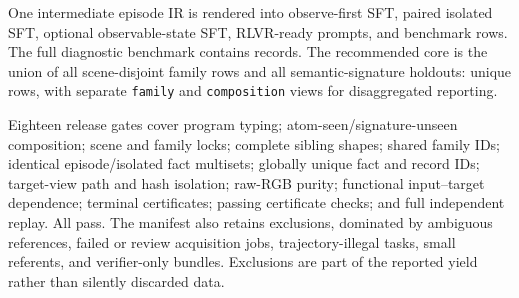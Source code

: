 One intermediate episode IR is rendered into observe-first SFT, paired
isolated SFT, optional observable-state SFT, RLVR-ready prompts, and benchmark
rows.  The full diagnostic benchmark contains \EpiBenchmarkRecords{} records.
The recommended core is the union of all scene-disjoint family rows and all
semantic-signature holdouts: \EpiCoreBenchmarkRecords{} unique rows, with
separate \texttt{family} and \texttt{composition} views for disaggregated
reporting.

Eighteen release gates cover program typing; atom-seen/signature-unseen
composition; scene and family locks; complete sibling shapes; shared family
IDs; identical episode/isolated fact multisets; globally unique fact and record
IDs; target-view path and hash isolation; raw-RGB purity; functional
input--target dependence; terminal certificates; passing certificate checks;
and full independent replay.  All pass.  The manifest also retains
\EpiRejectedItems{} exclusions, dominated by ambiguous references, failed or
review acquisition jobs, trajectory-illegal tasks, small referents, and
verifier-only bundles.  Exclusions are part of the reported yield rather than
silently discarded data.
